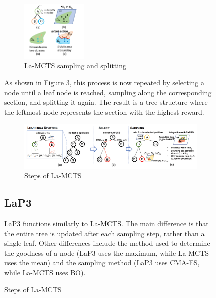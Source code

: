 \documentclass[bibliography=totoc]{scrartcl}
\begin{document}
\begin{figure}[H]
\begin{figure}[H]
	\centering
	\includegraphics[width = {0.35\textwidth}]{img/lamcts_1.png}
	\caption{\ac{La-MCTS} sampling and splitting \cite[p.3]{La-MCTS}}
	\label{fig:laMCTS_sampling_splitting}
    \vspace{-20pt}
\end{figure}
As shown in Figure \ref{fig:laMCTS_workflow}, this process is now repeated by selecting a node until a leaf node is reached, sampling along the corresponding section, and splitting it again.
The result is a tree structure where the leftmost node represents the section with the highest reward. 

\begin{figure}[H]
	\centering
	\includegraphics[width = {\textwidth}]{img/lamcts_workflow.png}
	\caption{Steps of \ac{La-MCTS} \cite[p.4]{La-MCTS}}
	\label{fig:laMCTS_workflow}
    \vspace{-20pt}
\end{figure}

\subsection{LaP3}
\ac{LaP3} functions similarly to \ac{La-MCTS}. The main difference is that the entire tree is updated after each sampling step, rather than a single leaf. Other differences include the method used to determine the goodness of a node (\ac{LaP3} uses the maximum, while \ac{La-MCTS} uses the mean) and the sampling method (\ac{LaP3} uses \ac{CMA-ES}, while \ac{La-MCTS} uses \ac{BO}). \cite{NEURIPS2021_03a3655f} \cite{La-MCTS}

\end{figure}
\end{document}
